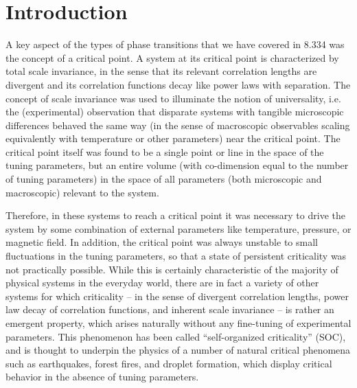 \documentclass[aps,prb,reprint,superscriptaddress]{revtex4-2}
\begin{document}

\maketitle

\section{Introduction}

A key aspect of the types of phase transitions that we have covered in 8.334 was the concept of a critical point. A system at its critical point is characterized by total scale invariance, in the sense that its relevant correlation lengths are divergent and its correlation functions decay like power laws with separation. The concept of scale invariance was used to illuminate the notion of universality, i.e. the (experimental) observation that disparate systems with tangible microscopic differences behaved the same way (in the sense of macroscopic observables scaling equivalently with temperature or other parameters) near the critical point. The critical point itself was found to be a single point or line in the space of the tuning parameters, but an entire volume (with co-dimension equal to the number of tuning parameters) in the space of all parameters (both microscopic and macroscopic) relevant to the system.

Therefore, in these systems to reach a critical point it was necessary to drive the system by some combination of external parameters like temperature, pressure, or magnetic field. In addition, the critical point was always unstable to small fluctuations in the tuning parameters, so that a state of persistent criticality was not practically possible. While this is certainly characteristic of the majority of physical systems in the everyday world, there are in fact a variety of other systems for which criticality -- in the sense of divergent correlation lengths, power law decay of correlation functions, and inherent scale invariance -- is rather an emergent property, which arises naturally without any fine-tuning of experimental parameters\cite{jensen, otherbook}. This phenomenon has been called ``self-organized criticality'' (SOC), and is thought to underpin the physics of a number of natural critical phenomena such as earthquakes, forest fires, and droplet formation, which display critical behavior in the absence of tuning parameters.
\end{document}
